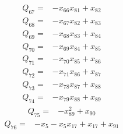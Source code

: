 \begin{equation*}\begin{aligned}
Q_{67}={}& -x_{66}x_{81}+x_{82}
\end{aligned}\end{equation*}
\begin{equation*}\begin{aligned}
Q_{68}={}& -x_{67}x_{82}+x_{83}
\end{aligned}\end{equation*}
\begin{equation*}\begin{aligned}
Q_{69}={}& -x_{68}x_{83}+x_{84}
\end{aligned}\end{equation*}
\begin{equation*}\begin{aligned}
Q_{70}={}& -x_{69}x_{84}+x_{85}
\end{aligned}\end{equation*}
\begin{equation*}\begin{aligned}
Q_{71}={}& -x_{70}x_{85}+x_{86}
\end{aligned}\end{equation*}
\begin{equation*}\begin{aligned}
Q_{72}={}& -x_{71}x_{86}+x_{87}
\end{aligned}\end{equation*}
\begin{equation*}\begin{aligned}
Q_{73}={}& -x_{78}x_{87}+x_{88}
\end{aligned}\end{equation*}
\begin{equation*}\begin{aligned}
Q_{74}={}& -x_{79}x_{88}+x_{89}
\end{aligned}\end{equation*}
\begin{equation*}\begin{aligned}
Q_{75}={}& -x_{89}^{2}+x_{90}
\end{aligned}\end{equation*}
\begin{equation*}\begin{aligned}
Q_{76}={}& -x_{5}-x_{5}x_{17}+x_{17}+x_{91}
\end{aligned}\end{equation*}
